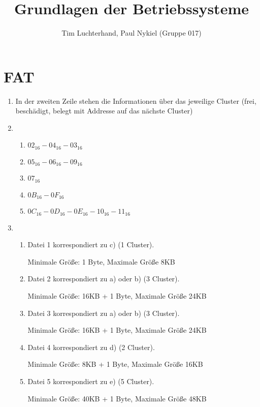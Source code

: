 \documentclass[DIN, pagenumber=false, fontsize=11pt, parskip=half]{scrartcl}
\title{Grundlagen der Betriebssysteme}
\author{Tim Luchterhand, Paul Nykiel (Gruppe 017)}
\begin{document}
    \maketitle
    \section{FAT}
    \begin{enumerate}[label=(\alph*)]
        \item In der zweiten Zeile stehen die Informationen über das jeweilige Cluster (frei, beschädigt, belegt mit Addresse auf das nächste Cluster)
        \item 
            \begin{enumerate}
                \item ${02}_{16}-{04}_{16}-{03}_{16}$
                \item ${05}_{16}-{06}_{16}-{09}_{16}$ 
                \item ${07}_{16}$
                \item ${0B}_{16}-{0F}_{16}$
                \item ${0C}_{16}-{0D}_{16}-{0E}_{16}-{10}_{16}-{11}_{16}$            
            \end{enumerate}
        \item 
            \begin{enumerate}
                \item Datei 1 korrespondiert zu c) (1 Cluster). 
                    
                    Minimale Größe: 1 Byte, Maximale Größe 8KB
                \item Datei 2 korrespondiert zu a) oder b) (3 Cluster). 
                    
                    Minimale Größe: 16KB + 1 Byte, Maximale Größe 24KB
                \item Datei 3 korrespondiert zu a) oder b) (3 Cluster). 
                    
                    Minimale Größe: 16KB + 1 Byte, Maximale Größe 24KB
                \item Datei 4 korrespondiert zu d) (2 Cluster). 
                    
                    Minimale Größe: 8KB + 1 Byte, Maximale Größe 16KB
                \item Datei 5 korrespondiert zu e) (5 Cluster). 
                    
                    Minimale Größe: 40KB + 1 Byte, Maximale Größe 48KB
            \end{enumerate}
    \end{enumerate}
\end{document}
